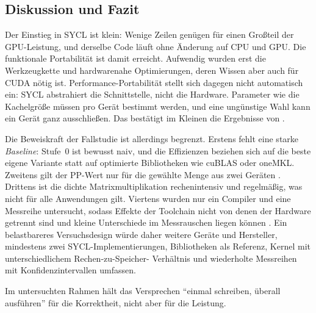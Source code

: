 \documentclass[12pt,a4paper]{article}
\begin{document}
\subsection{Diskussion und Fazit}

Der Einstieg in SYCL ist klein: Wenige Zeilen genügen für einen Großteil der
GPU-Leistung, und derselbe Code läuft ohne Änderung auf CPU und GPU. Die
funktionale Portabilität ist damit erreicht. Aufwendig wurden erst die
Werkzeugkette und hardwarenahe Optimierungen, deren Wissen aber auch für CUDA
nötig ist. Performance-Portabilität stellt sich dagegen nicht automatisch
ein: SYCL abstrahiert die Schnittstelle, nicht die Hardware. Parameter wie
die Kachelgröße müssen pro Gerät bestimmt werden, und eine ungünstige Wahl
kann ein Gerät ganz ausschließen. Das bestätigt im Kleinen die Ergebnisse von
\cite{deakin2020sycl, breyer2022svm}.

Die Beweiskraft der Fallstudie ist allerdings begrenzt. Erstens fehlt eine
starke \emph{Baseline}: Stufe~0 ist bewusst naiv, und die Effizienzen
beziehen sich auf die beste eigene Variante statt auf optimierte Bibliotheken
wie cuBLAS oder oneMKL. Zweitens gilt der PP-Wert
nur für die gewählte Menge aus zwei Geräten \cite{pennycook2019implications}.
Drittens ist die dichte Matrixmultiplikation rechenintensiv und regelmäßig,
was nicht für alle Anwendungen gilt. Viertens wurden nur ein Compiler und eine Messreihe
untersucht, sodass Effekte der Toolchain nicht von denen der Hardware
getrennt sind und kleine Unterschiede im Messrauschen liegen können
\cite{georges2007rigorous}. Ein belastbareres Versuchsdesign würde daher
weitere Geräte und Hersteller, mindestens zwei SYCL-Implementierungen,
Bibliotheken als Referenz, Kernel mit unterschiedlichem Rechen-zu-Speicher-%
Verhältnis und wiederholte Messreihen mit Konfidenzintervallen umfassen.

Im untersuchten Rahmen hält das Versprechen \enquote{einmal schreiben,
überall ausführen} für die Korrektheit, nicht aber für die Leistung.

\newpage
\printbibliography[heading=bibintoc, title={Literaturverzeichnis}]
\end{document}
